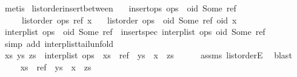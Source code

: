 \begin{isabellebody}
\ metis\isanewline
{}\isamarkupfalse%
%
\endisatagproof
{\isafoldproof}%
%
\isadelimproof
\isanewline
%
\endisadelimproof
\isanewline
{}\isamarkupfalse%
\ list{\isacharunderscore}order{\isacharunderscore}insert{\isacharunderscore}between{\isacharcolon}\isanewline
\ \ \ {\isachardoublequoteopen}insert{\isacharunderscore}ops\ {\isacharparenleft}ops\ {\isacharat}\ {\isacharbrackleft}{\isacharparenleft}oid{\isacharcomma}\ Some\ ref{\isacharparenright}{\isacharbrackright}{\isacharparenright}{\isachardoublequoteclose}\isanewline
\ \ \ \ \ {\isachardoublequoteopen}list{\isacharunderscore}order\ ops\ ref\ x{\isachardoublequoteclose}\isanewline
\ \ \ {\isachardoublequoteopen}list{\isacharunderscore}order\ {\isacharparenleft}ops\ {\isacharat}\ {\isacharbrackleft}{\isacharparenleft}oid{\isacharcomma}\ Some\ ref{\isacharparenright}{\isacharbrackright}{\isacharparenright}\ oid\ x{\isachardoublequoteclose}\isanewline
%
\isadelimproof
%
\endisadelimproof
%
\isatagproof
{}\isamarkupfalse%
\ {\isacharminus}\isanewline
\ \ \isamarkupfalse%
\ {\isachardoublequoteopen}interp{\isacharunderscore}list\ {\isacharparenleft}ops\ {\isacharat}\ {\isacharbrackleft}{\isacharparenleft}oid{\isacharcomma}\ Some\ ref{\isacharparenright}{\isacharbrackright}{\isacharparenright}\ {\isacharequal}\ insert{\isacharunderscore}spec\ {\isacharparenleft}interp{\isacharunderscore}list\ ops{\isacharparenright}\ {\isacharparenleft}oid{\isacharcomma}\ Some\ ref{\isacharparenright}{\isachardoublequoteclose}\isanewline
\ \ \ \ \isamarkupfalse%
\ {\isacharparenleft}simp\ add{\isacharcolon}\ interp{\isacharunderscore}list{\isacharunderscore}tail{\isacharunderscore}unfold{\isacharparenright}\isanewline
\ \ \isamarkupfalse%
\ \isamarkupfalse%
\ xs\ ys\ zs\ \ {\isachardoublequoteopen}interp{\isacharunderscore}list\ ops\ {\isacharequal}\ xs\ {\isacharat}\ {\isacharbrackleft}ref{\isacharbrackright}\ {\isacharat}\ ys\ {\isacharat}\ {\isacharbrackleft}x{\isacharbrackright}\ {\isacharat}\ zs{\isachardoublequoteclose}\isanewline
\ \ \ \ \isamarkupfalse%
\ assms\ list{\isacharunderscore}orderE\ \isamarkupfalse%
\ blast\isanewline
\ \ \isamarkupfalse%
\ \isamarkupfalse%
\ {\isachardoublequoteopen}{\isachardot}{\isachardot}{\isachardot}\ {\isacharequal}\ xs\ {\isacharat}\ ref\ {\isacharhash}\ {\isacharparenleft}ys\ {\isacharat}\ {\isacharbrackleft}x{\isacharbrackright}\ {\isacharat}\ zs{\isacharparenright}{\isachardoublequoteclose}\isanewline

\end{isabellebody}
